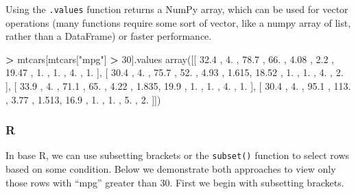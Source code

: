 \documentclass[
]{book}
\newenvironment{Shaded}{\begin{snugshade}}{\end{snugshade}}
\newcommand{\DecValTok}[1]{\textcolor[rgb]{0.00,0.00,0.81}{#1}}
\newcommand{\FloatTok}[1]{\textcolor[rgb]{0.00,0.00,0.81}{#1}}
\newcommand{\NormalTok}[1]{#1}
\newcommand{\OperatorTok}[1]{\textcolor[rgb]{0.81,0.36,0.00}{\textbf{#1}}}
\newcommand{\StringTok}[1]{\textcolor[rgb]{0.31,0.60,0.02}{#1}}
\begin{document}
Using the \texttt{.values} function returns a NumPy array, which can be used for vector operations (many functions require some sort of vector, like a numpy array of list, rather than a DataFrame) or faster performance.

\begin{Shaded}
\begin{Highlighting}[]
\OperatorTok{\textgreater{}}\NormalTok{ mtcars[mtcars[}\StringTok{"mpg"}\NormalTok{] }\OperatorTok{\textgreater{}} \DecValTok{30}\NormalTok{].values}
\NormalTok{array([[ }\FloatTok{32.4}\NormalTok{  ,   }\FloatTok{4.}\NormalTok{   ,  }\FloatTok{78.7}\NormalTok{  ,  }\FloatTok{66.}\NormalTok{   ,   }\FloatTok{4.08}\NormalTok{ ,   }\FloatTok{2.2}\NormalTok{  ,  }\FloatTok{19.47}\NormalTok{ ,}
          \FloatTok{1.}\NormalTok{   ,   }\FloatTok{1.}\NormalTok{   ,   }\FloatTok{4.}\NormalTok{   ,   }\FloatTok{1.}\NormalTok{   ],}
\NormalTok{       [ }\FloatTok{30.4}\NormalTok{  ,   }\FloatTok{4.}\NormalTok{   ,  }\FloatTok{75.7}\NormalTok{  ,  }\FloatTok{52.}\NormalTok{   ,   }\FloatTok{4.93}\NormalTok{ ,   }\FloatTok{1.615}\NormalTok{,  }\FloatTok{18.52}\NormalTok{ ,}
          \FloatTok{1.}\NormalTok{   ,   }\FloatTok{1.}\NormalTok{   ,   }\FloatTok{4.}\NormalTok{   ,   }\FloatTok{2.}\NormalTok{   ],}
\NormalTok{       [ }\FloatTok{33.9}\NormalTok{  ,   }\FloatTok{4.}\NormalTok{   ,  }\FloatTok{71.1}\NormalTok{  ,  }\FloatTok{65.}\NormalTok{   ,   }\FloatTok{4.22}\NormalTok{ ,   }\FloatTok{1.835}\NormalTok{,  }\FloatTok{19.9}\NormalTok{  ,}
          \FloatTok{1.}\NormalTok{   ,   }\FloatTok{1.}\NormalTok{   ,   }\FloatTok{4.}\NormalTok{   ,   }\FloatTok{1.}\NormalTok{   ],}
\NormalTok{       [ }\FloatTok{30.4}\NormalTok{  ,   }\FloatTok{4.}\NormalTok{   ,  }\FloatTok{95.1}\NormalTok{  , }\FloatTok{113.}\NormalTok{   ,   }\FloatTok{3.77}\NormalTok{ ,   }\FloatTok{1.513}\NormalTok{,  }\FloatTok{16.9}\NormalTok{  ,}
          \FloatTok{1.}\NormalTok{   ,   }\FloatTok{1.}\NormalTok{   ,   }\FloatTok{5.}\NormalTok{   ,   }\FloatTok{2.}\NormalTok{   ]])}
\end{Highlighting}
\end{Shaded}

\hypertarget{r-19}{%
\subsubsection*{R}\label{r-19}}

In base R, we can use subsetting brackets or the \texttt{subset()} function to select rows based on some condition. Below we demonstrate both approaches to view only those rows with ``mpg'' greater than 30. First we begin with subsetting brackets.
\end{document}
